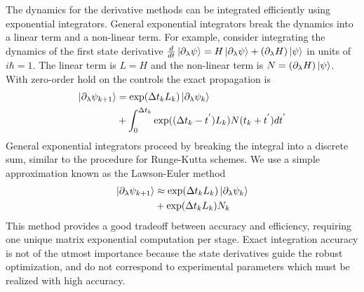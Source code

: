 The dynamics for the derivative methods can be integrated efficiently using exponential integrators.
General exponential integrators break the dynamics into a linear term and a non-linear term. For example, consider
integrating the dynamics of the first state derivative $\frac{d}{dt} \ket{\partial_{\lambda} \psi} =
H \ket{\partial_{\lambda} \psi} + (\partial_{\lambda} H) \ket{\psi}$ in units of $i\hbar = 1$.
The linear term is $L = H$ and the non-linear term is $N = (\partial_{\lambda} H) \ket{\psi}$.
With zero-order hold on the controls the exact propagation is
\begin{equation}
  \begin{aligned}
    \ket{\partial_{\lambda} \psi_{k + 1}} &= \exp(\Delta t_{k} L_{k}) \ket{\partial_{\lambda} \psi_{k}}\\
    &+ \int_{0}^{\Delta t_{k}} \exp((\Delta t_{k} - t^{'})L_{k}) N(t_{k} + t^{'}) dt^{'}\\
  \end{aligned}
\end{equation}
General exponential integrators proceed by breaking the integral into a discrete sum, similar to the procedure
for Runge-Kutta schemes. We use a simple approximation known as the Lawson-Euler method \cite{berland2005solving}
\begin{equation}
  \begin{aligned}
    \ket{\partial_{\lambda} \psi_{k + 1}} &\approx \exp(\Delta t_{k}L_{k}) \ket{\partial_{\lambda} \psi_{k}}\\
    &+ \exp(\Delta t_{k}L_{k}) N_{k}\\
  \end{aligned}
\end{equation}
This method provides a good tradeoff between accuracy and efficiency, requiring one unique matrix
exponential computation per stage. Exact integration accuracy is not of the utmost importance because the
state derivatives guide the robust optimization, and do not correspond to experimental parameters
which must be realized with high accuracy.





